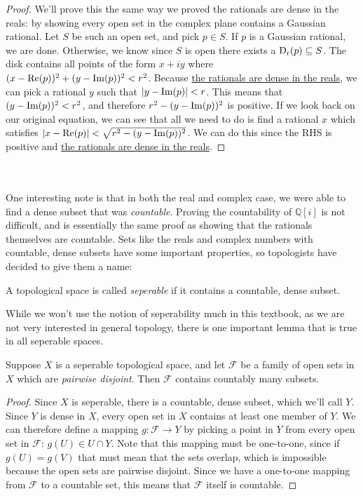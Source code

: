 \begin{proof}
We'll prove this the same way we proved the rationals are dense in the reals: by showing every open set in the complex plane contains a Gaussian rational. Let $S$ be such an open set, and pick $p \in S$. If $p$ is a Gaussian rational, we are done. Otherwise, we know since $S$ is open there exists a $\disk{p}{r} \subseteq S$. The disk contains all points of the form $x+iy$ where $(x-\rpart{p})^2+(y-\ipart{p})^2 < r^2$. Because \hyperlink{Density of Rationals in Reals}{the rationals are dense in the reals}, we can pick a rational $y$ such that $\modulus{y-\ipart{p}} < r$. This means that $(y-\ipart{p})^2 < r^2$, and therefore $r^2-(y-\ipart{p})^2$ is positive. If we look back on our original equation, we can see that all we need to do is find a rational $x$ which satisfies $\modulus{x-\rpart{p}} < \sqrt{r^2-(y-\ipart{p})^2}$. We can do this since the RHS is positive and \hyperlink{Density of Rationals in Reals}{the rationals are dense in the reals}.
\end{proof}
\\\\One interesting note is that in both the real and complex case, we were able to find a dense subset that was \emph{countable}. Proving the countability of $\mathbb{Q} [i]$ is not difficult, and is essentially the same proof as showing that the rationals themselves are countable. Sets like the reals and complex numbers with countable, dense subsets  have some important properties, so topologists have decided to give them a name:
\begin{definition}
A topological space is called \emph{seperable} if it contains a countable, dense subset.
\end{definition}
While we won't use the notion of seperability much in this textbook, as we are not very interested in general topology, there is one important lemma that is true in all seperable spaces.
\begin{lemma}
Suppose $X$ is a seperable topological space, and let $\mathcal{F}$ be a family of open sets in $X$ which are \emph{pairwise disjoint}. Then $\mathcal{F}$ contains countably many subsets.
\end{lemma}
\begin{proof}
Since $X$ is seperable, there is a countable, dense subset, which we'll call $Y$. Since $Y$ is dense in $X$, every open set in $X$ contains at least one member of $Y$. We can therefore define a mapping $g: \mathcal{F} \to Y$ by picking a point in $Y$ from every open set in $\mathcal{F}$: $g(U) \in U \cap Y$. Note that this mapping must be one-to-one, since if $g(U)=g(V)$ that must mean that the sets overlap, which is impossible because the open sets are pairwise disjoint. Since we have a one-to-one mapping from $\mathcal{F}$ to a countable set, this means that $\mathcal{F}$ itself is countable.
\end{proof}
